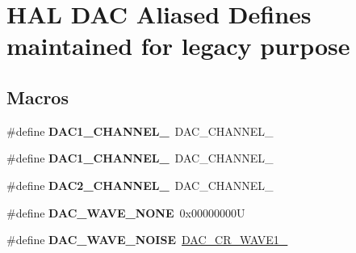 \hypertarget{group___h_a_l___d_a_c___aliased___defines}{}\section{H\+AL D\+AC Aliased Defines maintained for legacy purpose}
\label{group___h_a_l___d_a_c___aliased___defines}
\subsection*{Macros}
\begin{DoxyCompactItemize}
\item 
\mbox{\label{group___h_a_l___d_a_c___aliased___defines_gacd0eabd250f1026912b0e3f7deecb2e7}} 
\#define {\bfseries D\+A\+C1\+\_\+\+C\+H\+A\+N\+N\+E\+L\+\_}~D\+A\+C\+\_\+\+C\+H\+A\+N\+N\+E\+L\+\_
\item 
\mbox{\label{group___h_a_l___d_a_c___aliased___defines_ga6358f0c4cfc9a0e67a739bf6cf17870c}} 
\#define {\bfseries D\+A\+C1\+\_\+\+C\+H\+A\+N\+N\+E\+L\+\_}~D\+A\+C\+\_\+\+C\+H\+A\+N\+N\+E\+L\+\_
\item 
\mbox{\label{group___h_a_l___d_a_c___aliased___defines_ga8d40044bd0865cdb12fea604852f2582}} 
\#define {\bfseries D\+A\+C2\+\_\+\+C\+H\+A\+N\+N\+E\+L\+\_}~D\+A\+C\+\_\+\+C\+H\+A\+N\+N\+E\+L\+\_
\item 
\mbox{\label{group___h_a_l___d_a_c___aliased___defines_ga7e80010819867e162e936510093a4cef}} 
\#define {\bfseries D\+A\+C\+\_\+\+W\+A\+V\+E\+\_\+\+N\+O\+NE}~0x00000000U
\item 
\mbox{\label{group___h_a_l___d_a_c___aliased___defines_ga4585a41ff6dfd14971119283f1d8045b}} 
\#define {\bfseries D\+A\+C\+\_\+\+W\+A\+V\+E\+\_\+\+N\+O\+I\+SE}~\mbox{\hyperlink{group___peripheral___registers___bits___definition_ga0871e6466e3a7378103c431832ae525a}{D\+A\+C\+\_\+\+C\+R\+\_\+\+W\+A\+V\+E1\+\_}}
\item 
\mbox{\label{group___h_a_l___d_a_c___aliased___defines_ga8340be3743135476cb33a7daf7e6ace5}} 

\end{DoxyCompactItemize}
